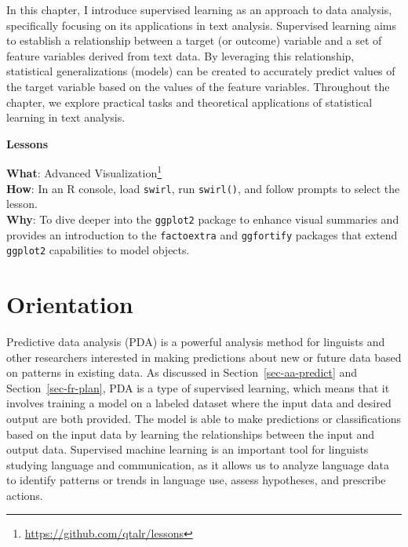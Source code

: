\documentclass[
  letterpaper,
]{latex/krantz}
\theoremstyle{definition}
\theoremstyle{remark}
\DeclareRobustCommand{\href}[2]{#2\footnote{\url{#1}}}
\begin{document}
In this chapter, I introduce supervised learning as an approach to data
analysis, specifically focusing on its applications in text analysis.
Supervised learning aims to establish a relationship between a target
(or outcome) variable and a set of feature variables derived from text
data. By leveraging this relationship, statistical generalizations
(models) can be created to accurately predict values of the target
variable based on the values of the feature variables. Throughout the
chapter, we explore practical tasks and theoretical applications of
statistical learning in text analysis.

\begin{tcolorbox}[enhanced jigsaw, colback=white, colframe=quarto-callout-color-frame, leftrule=.75mm, opacityback=0, rightrule=.15mm, bottomrule=.15mm, toprule=.15mm, breakable, left=2mm, arc=.35mm]

\textbf{ Lessons}

\textbf{What}: \href{https://github.com/qtalr/lessons}{Advanced
Visualization}\\
\textbf{How}: In an R console, load \texttt{swirl}, run
\texttt{swirl()}, and follow prompts to select the lesson.\\
\textbf{Why}: To dive deeper into the \texttt{ggplot2} package to
enhance visual summaries and provides an introduction to the
\texttt{factoextra} and \texttt{ggfortify} packages that extend
\texttt{ggplot2} capabilities to model objects.

\end{tcolorbox}

\section{Orientation}\label{sec-pda-orientation}

Predictive data analysis (PDA) is a powerful analysis method for
linguists and other researchers interested in making predictions about
new or future data based on patterns in existing data. As discussed in
Section~\ref{sec-aa-predict} and Section~\ref{sec-fr-plan}, PDA is a
type of supervised learning, which means that it involves training a
model on a labeled dataset where the input data and desired output are
both provided. The model is able to make predictions or classifications
based on the input data by learning the relationships between the input
and output data. Supervised machine learning is an important tool for
linguists studying language and communication, as it allows us to
analyze language data to identify patterns or trends in language use,
assess hypotheses, and prescribe actions.
\end{document}
